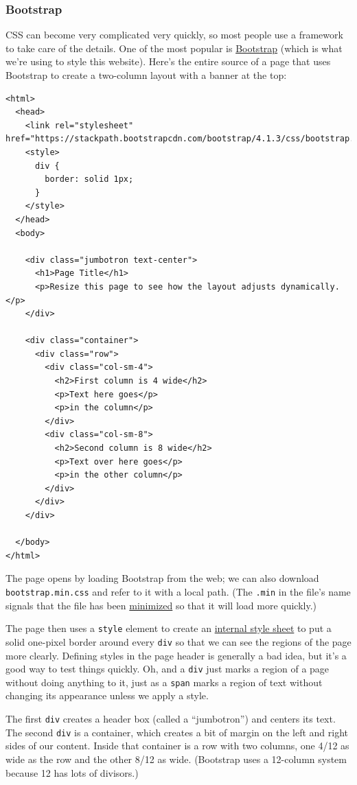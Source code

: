 \subsubsection{Bootstrap}\label{s:htmlcss-bootstrap}

CSS can become very complicated very quickly, so most people use a
framework to take care of the details. One of the most popular is
\href{https://getbootstrap.com/}{Bootstrap} (which is what we're using
to style this website). Here's the entire source of a page that uses
Bootstrap to create a two-column layout with a banner at the top:

\begin{verbatim}
<html>
  <head>
    <link rel="stylesheet" href="https://stackpath.bootstrapcdn.com/bootstrap/4.1.3/css/bootstrap.min.css">
    <style>
      div {
        border: solid 1px;
      }
    </style>
  </head>
  <body>

    <div class="jumbotron text-center">
      <h1>Page Title</h1>
      <p>Resize this page to see how the layout adjusts dynamically.</p>
    </div>

    <div class="container">
      <div class="row">
        <div class="col-sm-4">
          <h2>First column is 4 wide</h2>
          <p>Text here goes</p>
          <p>in the column</p>
        </div>
        <div class="col-sm-8">
          <h2>Second column is 8 wide</h2>
          <p>Text over here goes</p>
          <p>in the other column</p>
        </div>
      </div>
    </div>

  </body>
</html>
\end{verbatim}

The page opens by loading Bootstrap from the web; we can also download
\texttt{bootstrap.min.css} and refer to it with a local path. (The
\texttt{.min} in the file's name signals that the file has been
\protect\hyperlink{g:minimization}{minimized} so that it will load more
quickly.)

The page then uses a \texttt{style} element to create an
\protect\hyperlink{g:internal-style-sheet}{internal style sheet} to put
a solid one-pixel border around every \texttt{div} so that we can see
the regions of the page more clearly. Defining styles in the page header
is generally a bad idea, but it's a good way to test things quickly. Oh,
and a \texttt{div} just marks a region of a page without doing anything
to it, just as a \texttt{span} marks a region of text without changing
its appearance unless we apply a style.

The first \texttt{div} creates a header box (called a ``jumbotron'') and
centers its text. The second \texttt{div} is a container, which creates
a bit of margin on the left and right sides of our content. Inside that
container is a row with two columns, one 4/12 as wide as the row and the
other 8/12 as wide. (Bootstrap uses a 12-column system because 12 has
lots of divisors.)

